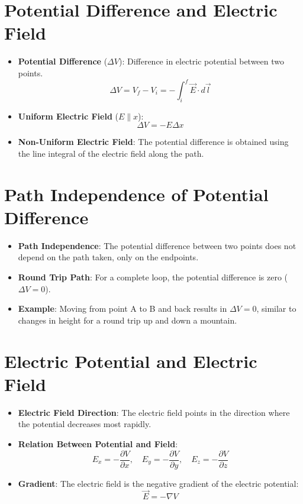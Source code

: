 \documentclass{article}
\begin{document}
\section*{Potential Difference and Electric Field}
\begin{itemize}
    \item \textbf{Potential Difference} (\(\Delta V\)): Difference in electric potential between two points.
    \[
    \Delta V = V_f - V_i = -\int_i^f \vec{E} \cdot d\vec{l}
    \]
    \item \textbf{Uniform Electric Field} (\(E \parallel x\)):
    \[
    \Delta V = -E \Delta x
    \]
    \item \textbf{Non-Uniform Electric Field}: The potential difference is obtained using the line integral of the electric field along the path.
\end{itemize}

\section*{Path Independence of Potential Difference}
\begin{itemize}
    \item \textbf{Path Independence}: The potential difference between two points does not depend on the path taken, only on the endpoints.
    \item \textbf{Round Trip Path}: For a complete loop, the potential difference is zero (\(\Delta V = 0\)).
    \item \textbf{Example}: Moving from point A to B and back results in \(\Delta V = 0\), similar to changes in height for a round trip up and down a mountain.
\end{itemize}

\section*{Electric Potential and Electric Field}
\begin{itemize}
    \item \textbf{Electric Field Direction}: The electric field points in the direction where the potential decreases most rapidly.
    \item \textbf{Relation Between Potential and Field}:
    \[
    E_x = -\frac{\partial V}{\partial x}, \quad E_y = -\frac{\partial V}{\partial y}, \quad E_z = -\frac{\partial V}{\partial z}
    \]
    \item \textbf{Gradient}: The electric field is the negative gradient of the electric potential:
    \[
    \vec{E} = -\nabla V
    \]
\end{itemize}
\end{document}
